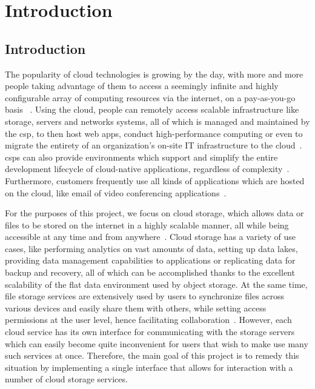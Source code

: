 \tableofcontents

\chapter{Introduction}

\section{Introduction}
The popularity of cloud technologies is growing by the day, with more and more people taking advantage of them to access a seemingly infinite and highly configurable array of computing resources via the internet, on a pay-as-you-go basis ~\cite{gvr}. Using the cloud, people can remotely access scalable infrastructure like storage, servers and networks systems, all of which is managed and maintained by the \ac{csp}, to then host web apps, conduct high-performance computing or even to migrate the entirety of an organization's on-site IT infrastructure to the cloud~\cite{iaas}. \ac{csp}s can also provide environments which support and simplify the entire development lifecycle of cloud-native applications, regardless of complexity~\cite{paas}. Furthermore, customers frequently use all kinds of applications which are hosted on the cloud, like email of video conferencing applications~\cite{saas}.

For the purposes of this project, we focus on cloud storage, which allows data or files to be stored on the internet in a highly scalable manner, all while being accessible at any time and from anywhere~\cite{s3_cloud_storage}. Cloud storage has a variety of use cases, like performing analytics on vast amounts of data, setting up data lakes, providing data management capabilities to applications or replicating data for backup and recovery, all of which can be accomplished thanks to the excellent scalability of the flat data environment used by object storage. At the same time, file storage services are extensively used by users to synchronize files across various devices and easily share them with others, while setting access permissions at the user level, hence facilitating collaboration~\cite{objectvsfile,objectvsfile2}. However, each cloud service has its own interface for communicating with the storage servers which can easily become quite inconvenient for users that wish to make use many such services at once. Therefore, the main goal of this project is to remedy this situation by implementing a single interface that allows for interaction with a number of cloud storage services.

